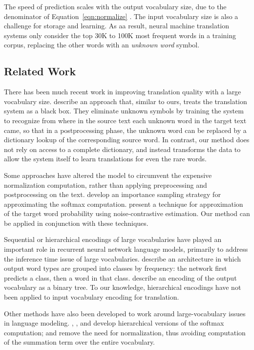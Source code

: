 The speed of prediction scales with the output vocabulary size, due to the
denominator of Equation~\ref{eqn:normalize} \cite{journals/corr/JeanCMB14}. The
input vocabulary size is also a challenge for storage and learning. As aa
result, neural machine translation systems only consider the top 30K to 100K
most frequent words in a training corpus, replacing the other words with an
\emph{unknown word} symbol.

\subsection{Related Work}
There has been much recent work in improving translation quality with a large
vocabulary size.  describe an approach that,
similar to ours, treats the translation system as a black box. They eliminate
unknown symbols by training the system to recognize from where in the source
text each unknown word in the target text came, so that in a postprocessing
phase, the unknown word can be replaced by a dictionary lookup of the
corresponding source word. In contrast, our method does not rely on access to a
complete dictionary, and instead transforms the data to allow the system itself
to learn translations for even the rare words.

Some approaches have altered the model to circumvent the expensive
normalization computation, rather than applying preprocessing and
postprocessing on the text.  develop an
importance sampling strategy for approximating the softmax computation.
 present a technique for approximation of the target
word probability using noise-contrastive estimation. Our method can be applied
in conjunction with these techniques.

Sequential or hierarchical encodings of large vocabularies have played an
important role in recurrent neural network language models, primarily to
address the inference time issue of large vocabularies. 
describe an architecture in which output word types are grouped into classes by
frequency: the network first predicts a class, then a word in that
class.  describe an encoding of the output
vocabulary as a binary tree. To our knowledge, hierarchical encodings have not
been applied to input vocabulary encoding for translation.

Other methods have also been developed to work around large-vocabulary issues
in language modeling. ,
, and  develop hierarchical versions
of the softmax computation;  and
 remove the need for normalization,
thus avoiding computation of the summation term over the entire vocabulary.


